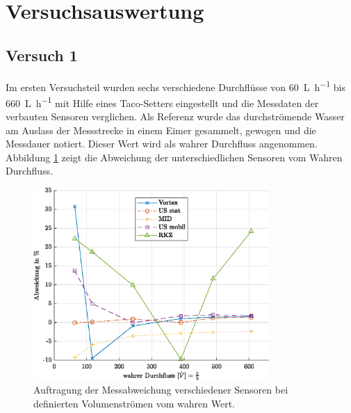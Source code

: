 \section{Versuchsauswertung}

\subsection{Versuch 1}
Im ersten Versuchsteil wurden sechs verschiedene Durchflüsse von \SI{60}{\liter\per\hour} bis \SI{660}{\liter\per\hour} mit Hilfe eines Taco-Setters eingestellt und die Messdaten der verbauten Sensoren verglichen. Als Referenz wurde das durchströmende Wasser am Auslass der Messstrecke in einem Eimer gesammelt, gewogen und die Messdauer notiert. Dieser Wert wird als wahrer Durchfluss angenommen. Abbildung \ref{fig:devPc} zeigt die Abweichung der unterschiedlichen Sensoren vom Wahren Durchfluss. 
\begin{figure}[H]
	\centering
	\includegraphics[width=0.8\textwidth]{../DATA/devPcPlot.eps}
	\caption[Messabweichung Sensoren]{Auftragung der Messabweichung verschiedener Sensoren bei definierten Volumenströmen vom wahren Wert.}
	\label{fig:devPc}
\end{figure}

